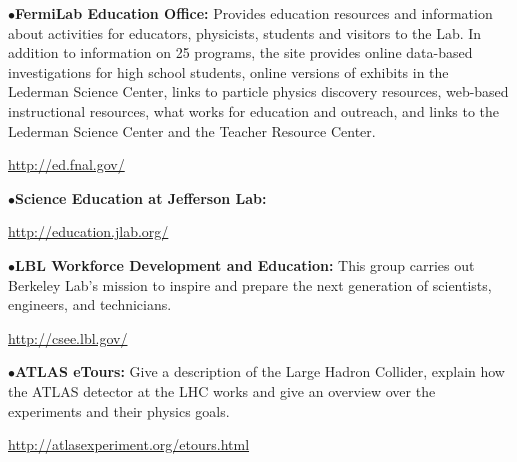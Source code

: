 \smallskip

\item{$\bullet$}{\bf FermiLab Education Office:}
Provides  education resources and information about activities for educators, physicists, students and visitors to the Lab. In addition to information on 25 programs, the site  provides online data-based investigations for high school students, online versions of exhibits in the Lederman Science Center, links to particle physics discovery resources, web-based instructional resources, what works for education and outreach, and links to the Lederman Science Center and the Teacher Resource Center.
	\item{}\qquad\url{http://ed.fnal.gov/}

\smallskip

\item{$\bullet$}{\bf Science Education at Jefferson Lab:}
	\item{}\qquad\url{http://education.jlab.org/}

\smallskip

\item{$\bullet$}{\bf LBL Workforce Development and Education:}
This group carries out Berkeley Lab’s mission to inspire and prepare the next generation of scientists, engineers, and technicians.
	\item{}\qquad\url{http://csee.lbl.gov/}

\medskip


\medskip



\medskip



\item{$\bullet$}{\bf ATLAS eTours:}
Give a description of the Large Hadron Collider, explain how the ATLAS detector at the LHC works and give an overview over the experiments and their physics goals.
	\item{}\qquad\url{http://atlasexperiment.org/etours.html}

\smallskip


